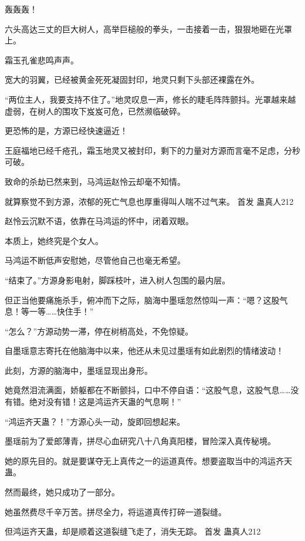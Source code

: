 
\begin{this_body}

轰轰轰！

六头高达三丈的巨大树人，高举巨槌般的拳头，一击接着一击，狠狠地砸在光罩上。

霜玉孔雀悲鸣声声。

宽大的羽翼，已经被黄金死死凝固封印，地灵只剩下头部还裸露在外。

“两位主人，我要支持不住了。”地灵叹息一声，修长的睫毛阵阵颤抖。光罩越来越虚弱，在树人的围攻下岌岌可危，已然濒临破碎。

更恐怖的是，方源已经快速逼近！

王庭福地已经千疮孔，霜玉地灵又被封印，剩下的力量对方源而言毫不足虑，分秒可破。

致命的杀劫已然来到，马鸿运赵怜云却毫不知情。

就算察觉不到方源，浓郁的死亡气息也厚重得叫人喘不过气来。  首发 蛊真人212

赵怜云沉默不语，依靠在马鸿运的怀中，闭着双眼。

本质上，她终究是个女人。

马鸿运不断低声安慰她，尽管他自己也毫无希望。

“结束了。”方源身影电射，脚踩枝叶，进入树人包围的最内层。

但正当他要痛施杀手，俯冲而下之际，脑海中墨瑶忽然惊叫一声：“嗯？这股气息！等一等……快住手！”

“怎么？”方源动势一滞，停在树梢高处，不免惊疑。

自墨瑶意志寄托在他脑海中以来，他还从未见过墨瑶有如此剧烈的情绪波动！

此刻，方源的脑海中，墨瑶显现出身形。

她竟然泪流满面，娇躯都在不断颤抖，口中不停自语：“这股气息，这股气息……没有错。绝对没有错！这是鸿运齐天蛊的气息啊！”

“鸿运齐天蛊？！”方源心头一动，旋即回想起来。

墨瑶前为了爱郎薄青，拼尽心血研究八十八角真阳楼，冒险深入真传秘境。

她的原先目的。就是要谋夺无上真传之一的运道真传。想要盗取当中的鸿运齐天蛊。

然而最终，她只成功了一部分。

她虽然费尽千辛万苦。拼尽全力，将运道真传打碎一道裂缝。

但鸿运齐天蛊，却是顺着这道裂缝飞走了，消失无踪。  首发 蛊真人212


\end{this_body}
